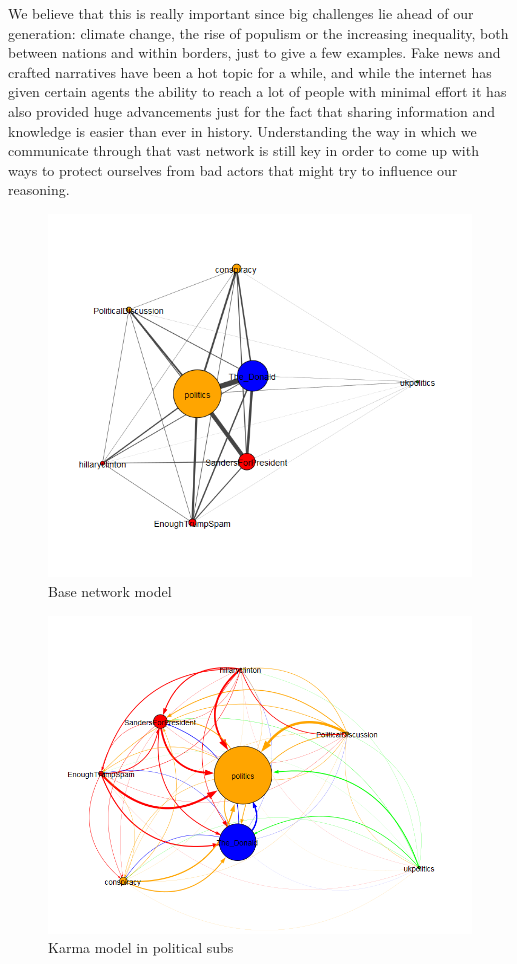 \documentclass[11pt]{article}
\begin{document}
We believe that this is really important since big challenges lie ahead of our generation: climate change, the rise of populism or the increasing inequality, both between nations and within borders, just to give a few examples. Fake news and crafted narratives have been a hot topic for a while, and while the internet has given certain agents the ability to reach a lot of people with minimal effort it has also provided huge advancements just for the fact that sharing information and knowledge is easier than ever in history. Understanding the way in which we communicate through that vast network is still key in order to come up with ways to protect ourselves from bad actors that might try to influence our reasoning.

\begin{figure}[h]
	\includegraphics[width=\textwidth]{img/base_network.png}
	\caption{\label{base_net_big} Base network model}
\end{figure}

\begin{figure}[h]
	\includegraphics[width=\textwidth]{img/karma_model.png}
	\caption{\label{karma_net_big} Karma model in political subs}
\end{figure}
\end{document}
